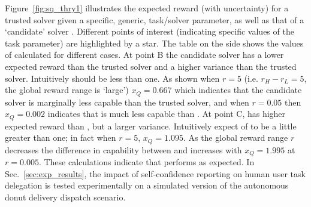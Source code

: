 %
%
Figure~\ref{fig:sq_thry1} illustrates the expected reward (with uncertainty) for a trusted solver \solvestar{} given a specific, generic, task/solver parameter, as well as that of a `candidate' solver \solve. Different points of interest (indicating specific values of the task parameter) are highlighted by a star. The table on the side shows the values of \xQ{} calculated for different cases. At point B the candidate solver has a lower expected reward than the trusted solver and a higher variance than the trusted solver. Intuitively \xQ{} should be less than one. As shown when $r=5$ (i.e. $r_H-r_L=5$, the global reward range is `large') $x_Q=0.667$ which indicates that the candidate solver is marginally less capable than the trusted solver, and when $r=0.05$ then $x_Q=0.002$ indicates that \solve{} is much less capable than \solvestar. At point C, \solve{} has higher expected reward than \solvestar, but a larger variance. Intuitively expect \xQ{} of \solve{} to be a little greater than one; in fact when $r=5$, $x_Q=1.095$. As the global reward range $r$ decreases the difference in capability between \solve{} and \solvestar{} increases with $x_Q=1.995$ at $r=0.005$. These calculations indicate that \xQ{} performs as expected. In Sec.~\ref{sec:exp_results}, the impact of self-confidence reporting on human user task delegation is tested experimentally on a simulated version of the autonomous donut delivery dispatch scenario. 

